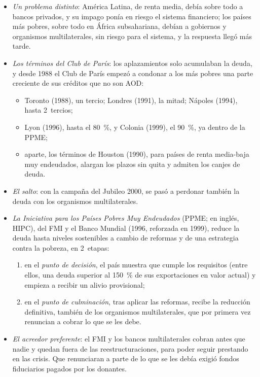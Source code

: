 \documentclass[11pt]{article}
\begin{document}
\begin{itemize}
\item \emph{Un problema distinto}: América Latina, de renta media, debía sobre todo a bancos privados, y su impago ponía en riesgo el sistema financiero; los países más pobres, sobre todo en África subsahariana, debían a gobiernos y organismos multilaterales, sin riesgo para el sistema, y la respuesta llegó más tarde.
\item \emph{Los términos del Club de París}: los aplazamientos solo acumulaban la deuda, y desde 1988 el Club de París empezó a condonar a los más pobres una parte creciente de sus créditos que no son AOD\nocite{ClubParis2026Terminos}:
  \begin{itemize}
  \item Toronto (1988), un tercio; Londres (1991), la mitad; Nápoles (1994), hasta 2~tercios;
  \item Lyon (1996), hasta el 80~\%, y Colonia (1999), el 90~\%, ya dentro de la PPME;
  \item aparte, los términos de Houston (1990), para países de renta media-baja muy endeudados, alargan los plazos sin quita y admiten los canjes de deuda.
  \end{itemize}
\item \emph{El salto}: con la campaña del Jubileo 2000, se pasó a perdonar también la deuda con los organismos multilaterales.
\item \emph{La Iniciativa para los Países Pobres Muy Endeudados} (PPME; en inglés, HIPC), del FMI y el Banco Mundial (1996, reforzada en 1999), reduce la deuda hasta niveles sostenibles a cambio de reformas y de una estrategia contra la pobreza, en 2~etapas\nocite{FMI2023HIPC,FMI1999HIPCReforzada}:
  \begin{enumerate}
  \item en el \emph{punto de decisión}, el país muestra que cumple los requisitos (entre ellos, una deuda superior al 150~\% de sus exportaciones en valor actual) y empieza a recibir un alivio provisional;
  \item en el \emph{punto de culminación}, tras aplicar las reformas, recibe la reducción definitiva, también de los organismos multilaterales, que por primera vez renuncian a cobrar lo que se les debe.
  \end{enumerate}
\item \emph{El acreedor preferente}: el FMI y los bancos multilaterales cobran antes que nadie y quedan fuera de las reestructuraciones, para poder seguir prestando en las crisis. Que renunciaran a parte de lo que se les debía exigió fondos fiduciarios pagados por los donantes.

\end{itemize}
\end{document}
